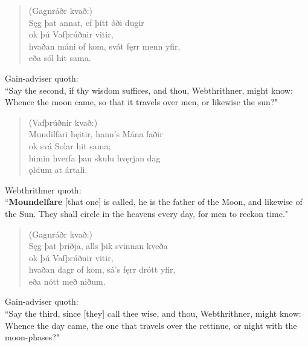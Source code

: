 \begin{verse}
(Gagnráðr kvað:) \\%
\bva Sęg þat annat, \hld ef þitt ǿði dugir \\%
\ind ok þú Vafþrúðnir vitir, \\%
hvaðan máni of kom, \hld svát fęrr menn yfir, \\%
\ind eða sól hit sama.\\%
\end{verse}

\bvb Gain-adviser quoth: \\ “Say the second, if thy wisdom suffices, and thou, Webthrithner, might know: Whence the moon came, so that it travels over men, or likewise the sun?" \\

\begin{verse}
(Vafþrúðnir kvað:) \\%
\bva Mundilfari hęitir, \hld hann's Mána faðir \\%
\ind ok svá Solar hit sama; \\%
himin hverfa \hld þau skulu hvęrjan dag \\%
\ind ǫldum at ártali.\\%
\end{verse}

\bvb Webthrithner quoth: \\ “\textbf{Moundelfare} [that one] is called, he is the father of the Moon, and likewise of the Sun. They shall circle in the heavens every day, for men to reckon time\footnotemark[40]." \\

\begin{verse}
(Gagnráðr kvað:) \\%
\bva Sęg þat þriðja, \hld alls þik svinnan kveða \\%
\ind ok þú Vafþrúðnir vitir, \\%
hvaðan dagr of kom, \hld sá's fęrr drótt yfir, \\%
\ind eða nótt með niðum.\\%
\end{verse}

\bvb Gain-adviser quoth: \\ “Say the third, since [they] call thee wise, and thou, Webthrithner, might know: Whence the day came, the one that travels over the rettinue, or night with the moon-phases?" \\

